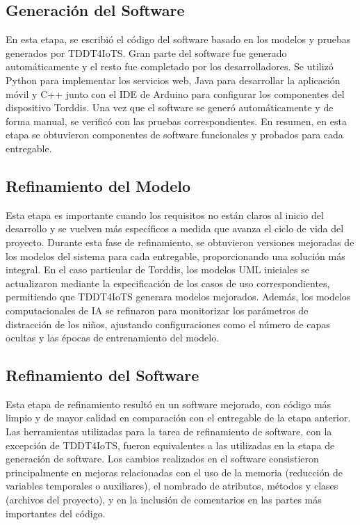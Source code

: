 \documentclass[a4paper,fleqn]{cas-sc}
\begin{document}
	\subsection{Generación del Software}
	En esta etapa, se escribió el código del software basado en los modelos y pruebas generados por TDDT4IoTS. Gran parte del software fue generado automáticamente y el resto fue completado por los desarrolladores. Se utilizó Python para implementar los servicios web, Java para desarrollar la aplicación móvil y C++ junto con el IDE de Arduino para configurar los componentes del dispositivo Torddis. Una vez que el software se generó automáticamente y de forma manual, se verificó con las pruebas correspondientes. En resumen, en esta etapa se obtuvieron componentes de software funcionales y probados para cada entregable.
	
	\subsection{Refinamiento del Modelo}
	Esta etapa es importante cuando los requisitos no están claros al inicio del desarrollo y se vuelven más específicos a medida que avanza el ciclo de vida del proyecto. Durante esta fase de refinamiento, se obtuvieron versiones mejoradas de los modelos del sistema para cada entregable, proporcionando una solución más integral. En el caso particular de Torddis, los modelos UML iniciales se actualizaron mediante la especificación de los casos de uso correspondientes, permitiendo que TDDT4IoTS generara modelos mejorados. Además, los modelos computacionales de IA se refinaron para monitorizar los parámetros de distracción de los niños, ajustando configuraciones como el número de capas ocultas y las épocas de entrenamiento del modelo.
	
	\subsection{Refinamiento del Software}
	Esta etapa de refinamiento resultó en un software mejorado, con código más limpio y de mayor calidad en comparación con el entregable de la etapa anterior. Las herramientas utilizadas para la tarea de refinamiento de software, con la excepción de TDDT4IoTS, fueron equivalentes a las utilizadas en la etapa de generación de software. Los cambios realizados en el software consistieron principalmente en mejoras relacionadas con el uso de la memoria (reducción de variables temporales o auxiliares), el nombrado de atributos, métodos y clases (archivos del proyecto), y en la inclusión de comentarios en las partes más importantes del código.
	
\end{document}
